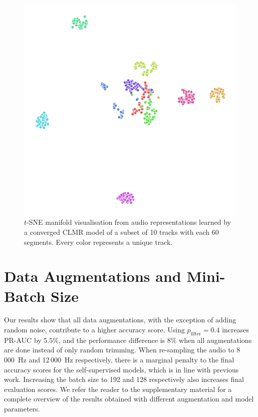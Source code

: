 \begin{figure}[t]
    \centering
    \includegraphics[width=0.75\columnwidth]{figs/tsne-clmr.png}
    \caption{$t$-SNE manifold visualisation from audio representations learned by a converged CLMR model of a subset of 10 tracks with each 60 segments.
Every color represents a unique track.}
    \label{fig:tsne_manifold}
\end{figure}



\section{Data Augmentations and Mini-Batch Size}
Our results show that all data augmentations, with the exception of adding random noise, contribute to a higher accuracy score.
Using $p_{\mathrm{filter}}=0.4$ increases PR-AUC by $5.5\%$, and the performance difference is $8\%$ when all augmentations are done instead of only random trimming.
When re-sampling the audio to 8\,000~Hz and 12\,000~Hz respectively, there is a marginal penalty to the final accuracy scores for the self-supervised models, which is in line with previous work\cite{lee2018samplecnn}.
Increasing the batch size to 192 and 128 respectively also increases final evaluation scores.
We refer the reader to the supplementary material for a complete overview of the results obtained with different augmentation and model parameters.


